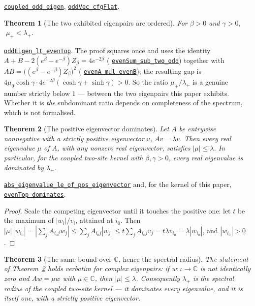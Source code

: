 \documentclass[11pt]{article}
\newtheorem{theorem}{Theorem}[section]
\theoremstyle{definition}
\newcommand{\anchor}{a70426f4c8a0ed733b4eee94fb01b158bc81fd08}
\newcommand{\osline}[3]{%
  \href{https://github.com/lluiseriksson/THE-ERIKSSON-PROGRAMME/blob/\anchor/YangMills/OS/#1.lean\#L#2}{\nolinkurl{#3}}}
\newcommand{\C}{\mathbb{C}}
\begin{document}
\osline{SpatialPerron}{310}{coupled\_odd\_eigen},
\osline{SpatialPerron}{304}{oddVec\_cfgFlat}.

\begin{theorem}[The two exhibited eigenpairs are ordered]\label{thm:order}
For $\beta>0$ and $\gamma>0$, $\;\mu_+<\lambda_+$.
\end{theorem}

\osline{SpatialPerron}{358}{oddEigen\_lt\_evenTop}.  The proof squares once
and uses the identity
$A+B-2(e^\beta-e^{-\beta})Z_\beta = 4e^{-2\beta}$
(\osline{SpatialPerron}{347}{evenSum\_sub\_two\_odd}) together with
$AB=\bigl((e^\beta-e^{-\beta})Z_\beta\bigr)^2$
(\osline{SpatialPerron}{339}{evenA\_mul\_evenB}); the resulting gap is
$4\mu_0\cosh\gamma\cdot 4e^{-2\beta}(\cosh\gamma+\sinh\gamma)>0$.  So the ratio
$\mu_+/\lambda_+$ is a genuine number strictly below $1$ --- between the two
eigenpairs this paper exhibits.  Whether it is \emph{the} subdominant ratio
depends on completeness of the spectrum, which is not formalised.

\begin{theorem}[The positive eigenvector dominates]\label{thm:dominates}
Let $A$ be entrywise nonnegative with a strictly positive eigenvector $v$,
$Av=\lambda v$.  Then every real eigenvalue $\mu$ of $A$, with any nonzero real
eigenvector, satisfies $|\mu|\le\lambda$.  In particular, for the coupled
two-site kernel with $\beta,\gamma>0$, every real eigenvalue is dominated by
$\lambda_+$.
\end{theorem}

\osline{SpatialPerron}{401}{abs\_eigenvalue\_le\_of\_pos\_eigenvector} and, for
the kernel of this paper,
\osline{SpatialPerron}{454}{evenTop\_dominates}.

\begin{proof}
Scale the competing eigenvector until it touches the positive one: let $t$ be
the maximum of $|w_i|/v_i$, attained at $i_0$.  Then
$|\mu|\,|w_{i_0}| = |\sum_j A_{i_0j}w_j| \le \sum_j A_{i_0j}|w_j|
\le t\sum_j A_{i_0j}v_j = t\lambda v_{i_0} = \lambda|w_{i_0}|$, and
$|w_{i_0}|>0$.
\end{proof}

\begin{theorem}[The same bound over $\C$, hence the spectral radius]
\label{thm:dominates-c}
The statement of Theorem~\ref{thm:dominates} holds verbatim for complex
eigenpairs: if $w:\iota\to\C$ is not identically zero and $Aw=\mu w$ with
$\mu\in\C$, then $|\mu|\le\lambda$.  Consequently $\lambda_+$ is the
\emph{spectral radius} of the coupled two-site kernel --- it dominates every
eigenvalue, and it is itself one, with a strictly positive eigenvector.
\end{theorem}
\end{document}

